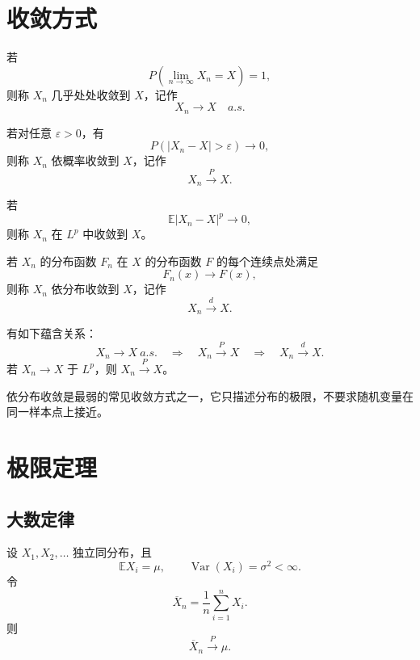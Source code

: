 \section{收敛方式}

\begin{definition}[几乎处处收敛]
若
\[
    P\left(\lim_{n\to\infty}X_n=X\right)=1,
\]
则称 $X_n$ 几乎处处收敛到 $X$，记作
\[
    X_n\to X\quad a.s.
\]
\end{definition}

\begin{definition}[依概率收敛]
若对任意 $\varepsilon>0$，有
\[
    P(|X_n-X|>\varepsilon)\to0,
\]
则称 $X_n$ 依概率收敛到 $X$，记作
\[
    X_n\xrightarrow{P}X.
\]
\end{definition}

\begin{definition}[$L^p$ 收敛]
若
\[
    \mathbb{E}|X_n-X|^p\to0,
\]
则称 $X_n$ 在 $L^p$ 中收敛到 $X$。
\end{definition}

\begin{definition}[依分布收敛]
若 $X_n$ 的分布函数 $F_n$ 在 $X$ 的分布函数 $F$ 的每个连续点处满足
\[
    F_n(x)\to F(x),
\]
则称 $X_n$ 依分布收敛到 $X$，记作
\[
    X_n\xrightarrow{d}X.
\]
\end{definition}

\begin{theorem}[收敛方式之间的关系]
有如下蕴含关系：
\[
    X_n\to X\ a.s.\quad\Longrightarrow\quad X_n\xrightarrow{P}X
    \quad\Longrightarrow\quad X_n\xrightarrow{d}X.
\]
若 $X_n\to X$ 于 $L^p$，则 $X_n\xrightarrow{P}X$。
\end{theorem}

\begin{remark}
依分布收敛是最弱的常见收敛方式之一，它只描述分布的极限，不要求随机变量在同一样本点上接近。
\end{remark}

\section{极限定理}

\subsection{大数定律}

\begin{theorem}[弱大数定律]
设 $X_1,X_2,\dots$ 独立同分布，且
\[
    \mathbb{E}X_i=\mu,
    \qquad
    \operatorname{Var}(X_i)=\sigma^2<\infty.
\]
令
\[
    \overline X_n=\frac1n\sum_{i=1}^n X_i.
\]
则
\[
    \overline X_n\xrightarrow{P}\mu.
\]
\end{theorem}

